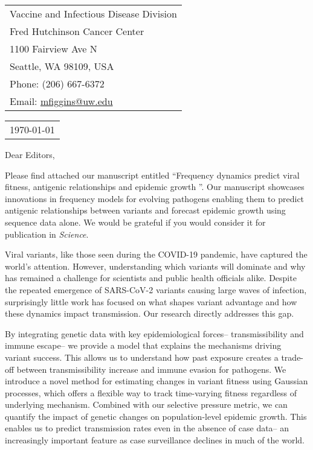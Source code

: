 \documentclass[11pt]{article}
\begin{document}
\thispagestyle{empty} %

\mbox{}\hfill
\begin{tabular}{l @{}}
	Vaccine and Infectious Disease Division \\
	Fred Hutchinson Cancer Center \\
	1100 Fairview Ave N \\
	Seattle, WA 98109, USA \\
	Phone: (206) 667-6372 \\
	Email: \href{mailto:mfiggins@uw.edu}{mfiggins@uw.edu} \\
\end{tabular}

\vspace{0.1in} %

\begin{tabular}{@{} l}
  \today
\end{tabular}

\vspace{0.1in} %

Dear Editors,

\medskip %

Please find attached our manuscript entitled ``Frequency dynamics predict viral fitness, antigenic relationships and epidemic growth
''.
Our manuscript showcases innovations in frequency models for evolving pathogens enabling them to predict antigenic relationships between variants and forecast epidemic growth using sequence data alone.
We would be grateful if you would consider it for publication in \textit{Science}.

Viral variants, like those seen during the COVID-19 pandemic, have captured the world’s attention.
However, understanding which variants will dominate and why has remained a challenge for scientists and public health officials alike.
Despite the repeated emergence of SARS-CoV-2 variants causing large waves of infection, surprisingly little work has focused on what shapes variant advantage and how these dynamics impact transmission.
Our research directly addresses this gap.

By integrating genetic data with key epidemiological forces-- transmissibility and immune escape-- we provide a model that explains the mechanisms driving variant success.
This allows us to understand how past exposure creates a trade-off between transmissibility increase and immune evasion for pathogens.
We introduce a novel method for estimating changes in variant fitness using Gaussian processes, which offers a flexible way to track time-varying fitness regardless of underlying mechanism.
Combined with our selective pressure metric, we can quantify the impact of genetic changes on population-level epidemic growth.
This enables us to predict transmission rates even in the absence of case data-- an increasingly important feature as case surveillance declines in much of the world.
\end{document}
